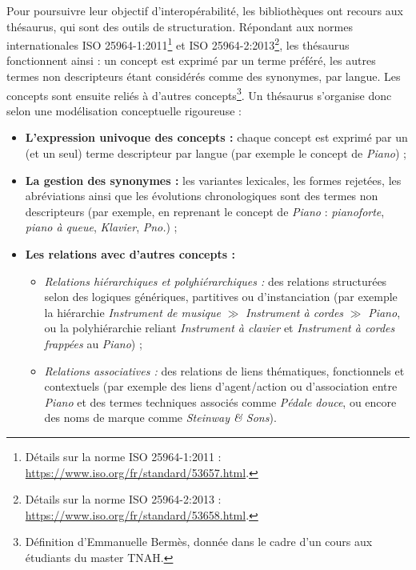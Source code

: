 Pour poursuivre leur objectif d’interopérabilité, les bibliothèques ont recours aux thésaurus, qui sont des outils de structuration. Répondant aux normes internationales ISO 25964-1:2011\footnote{Détails sur la norme ISO 25964-1:2011 : \url{https://www.iso.org/fr/standard/53657.html}.} et ISO 25964-2:2013\footnote{Détails sur la norme ISO 25964-2:2013 : \url{https://www.iso.org/fr/standard/53658.html}.}, les thésaurus fonctionnent ainsi : un concept est exprimé par un terme préféré, les autres termes non descripteurs étant considérés comme des synonymes, par langue. Les concepts sont ensuite reliés à d’autres concepts\footnote{Définition d'Emmanuelle Bermès, donnée dans le cadre d’un cours aux étudiants du master TNAH.}. Un thésaurus s’organise donc selon une modélisation conceptuelle rigoureuse :

\begin{itemize}
	\item \textbf{L’expression univoque des concepts :} chaque concept est exprimé par un (et un seul) terme descripteur par langue (par exemple le concept de \textit{Piano}) ;
	\item \textbf{La gestion des synonymes :} les variantes lexicales, les formes rejetées, les abréviations ainsi que les évolutions chronologiques sont des termes non descripteurs (par exemple, en reprenant le concept de \textit{Piano} : \textit{pianoforte}, \textit{piano à queue}, \textit{Klavier}, \textit{Pno.}) ;
	\item \textbf{Les relations avec d’autres concepts :}
	\begin{itemize}
		\item \textit{Relations hiérarchiques et polyhiérarchiques :} des relations structurées selon des logiques génériques, partitives ou d’instanciation (par exemple la hiérarchie \textit{Instrument de musique} $\gg$ \textit{Instrument à cordes} $\gg$ \textit{Piano}, ou la polyhiérarchie reliant \textit{Instrument à clavier} et \textit{Instrument à cordes frappées} au \textit{Piano}) ;
		\item \textit{Relations associatives :} des relations de liens thématiques, fonctionnels et contextuels (par exemple des liens d'agent/action ou d'association entre \textit{Piano} et des termes techniques associés comme \textit{Pédale douce}, ou encore des noms de marque comme \textit{Steinway \& Sons}).
	\end{itemize}
\end{itemize}

